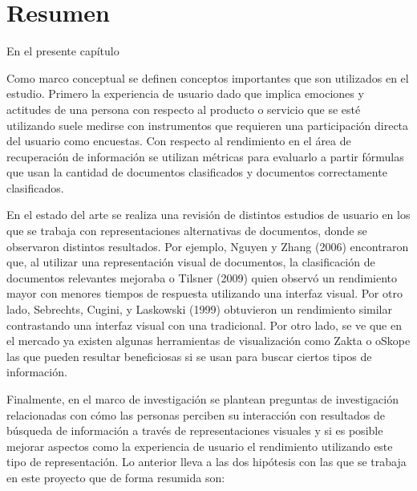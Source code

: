 \section{Resumen}
\label{sec:marco_estado_arte_resumen}
En el presente capítulo

Como marco conceptual se definen conceptos importantes que son utilizados en el estudio. Primero la experiencia de usuario dado que implica emociones y actitudes de una persona con respecto al producto o servicio que se esté utilizando suele medirse con instrumentos que requieren una participación directa del usuario como encuestas. Con respecto al rendimiento en el área de recuperación de información se utilizan métricas para evaluarlo a partir fórmulas que usan la cantidad de documentos clasificados y documentos correctamente clasificados.

En el estado del arte se realiza una revisión de distintos estudios de usuario en los que se trabaja con representaciones alternativas de documentos, donde se observaron distintos resultados. Por ejemplo, Nguyen y Zhang (2006) encontraron que, al utilizar una representación visual de documentos, la clasificación de documentos relevantes mejoraba o Tilsner (2009) quien observó un rendimiento mayor con menores tiempos de respuesta utilizando una interfaz visual. Por otro lado, Sebrechts, Cugini, y Laskowski (1999) obtuvieron un rendimiento similar contrastando una interfaz visual con una tradicional. Por otro lado, se ve que en el mercado ya existen algunas herramientas de visualización como Zakta o oSkope las que pueden resultar beneficiosas si se usan para buscar ciertos tipos de información.

Finalmente, en el marco de investigación se plantean preguntas de investigación relacionadas con cómo las personas perciben su interacción con resultados de búsqueda de información a través de representaciones visuales y si es posible mejorar aspectos como la experiencia de usuario el rendimiento utilizando este tipo de representación. Lo anterior lleva a las dos hipótesis con las que se trabaja en este proyecto que de forma resumida son:

